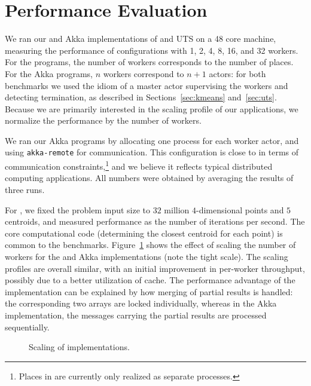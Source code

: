 \section{Performance Evaluation}
\label{sec:perf}
We ran our \apgas and Akka implementations of \kmeans and UTS on a 48 core
machine, measuring the performance of configurations with 1, 2, 4, 8, 16, and
32 workers. For the \apgas programs, the number of workers corresponds to the
number of places. For the Akka programs, $n$ workers correspond to $n+1$
actors: for both benchmarks we used the idiom of a master actor supervising the
workers and detecting termination, as described in Sections~\ref{sec:kmeans}
and~\ref{sec:uts}. Because we are primarily interested in the scaling profile of
our applications, we normalize the performance by the number of workers.

We ran our Akka programs by allocating one process for each worker actor, and
using \lstinline{akka-remote} for communication. This configuration is close to
\apgas in terms of communication constraints,\footnote{Places in \apgas are
currently only realized as separate processes.} and we believe it reflects
typical distributed computing applications. All numbers were obtained by
averaging the results of three runs.

For \kmeans, we fixed the problem input size to $32$ million $4$-dimensional
points and $5$ centroids, and measured performance as the number of iterations
per second. The core computational code (determining the closest centroid for
each point) is common to the benchmarks. Figure~\ref{fig:kmeans-scaling} shows
the effect of scaling the number of workers for the \apgas and Akka
implementations (note the tight scale). The scaling profiles are overall
similar, with an initial improvement in per-worker throughput, possibly due to
a better utilization of cache. The performance advantage of the \apgas
implementation can be explained by how merging of partial results is handled:
the corresponding two arrays are locked individually, whereas in the Akka
implementation, the messages carrying the partial results are processed
sequentially.

\begin{figure}
\vspace{-0.3cm}
\hspace{-0.2cm}
\begingroup\graphicspath{{figures/}}\endgroup
\vspace{-0.2cm}
\caption{Scaling of \kmeans implementations.}
\label{fig:kmeans-scaling}
\end{figure}

